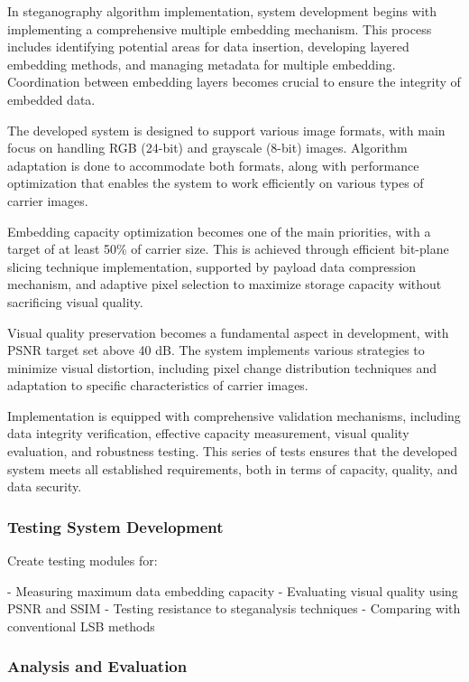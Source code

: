 \documentclass{ittelkom}
\begin{document}
In steganography algorithm implementation, system development begins with
implementing a comprehensive multiple embedding mechanism. This process
includes identifying potential areas for data insertion, developing layered
embedding methods, and managing metadata for multiple embedding. Coordination
between embedding layers becomes crucial to ensure the integrity of embedded
data.

The developed system is designed to support various image formats, with main
focus on handling RGB (24-bit) and grayscale (8-bit) images. Algorithm
adaptation is done to accommodate both formats, along with performance
optimization that enables the system to work efficiently on various types of
carrier images.

Embedding capacity optimization becomes one of the main priorities, with a
target of at least 50\% of carrier size. This is achieved through efficient
bit-plane slicing technique implementation, supported by payload data
compression mechanism, and adaptive pixel selection to maximize storage
capacity without sacrificing visual quality.

Visual quality preservation becomes a fundamental aspect in development, with
PSNR target set above 40 dB. The system implements various strategies to
minimize visual distortion, including pixel change distribution techniques and
adaptation to specific characteristics of carrier images.

Implementation is equipped with comprehensive validation mechanisms, including
data integrity verification, effective capacity measurement, visual quality
evaluation, and robustness testing. This series of tests ensures that the
developed system meets all established requirements, both in terms of capacity,
quality, and data security.

\subsubsection{Testing System Development}

Create testing modules for:

- Measuring maximum data embedding capacity
- Evaluating visual quality using PSNR and SSIM
- Testing resistance to steganalysis techniques
- Comparing with conventional LSB methods

\subsubsection{Analysis and Evaluation}
\end{document}
